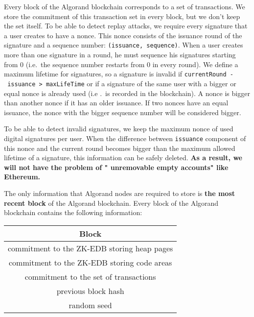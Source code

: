 \documentclass[11pt, A4]{article}
\begin{document}
    Every block of the Algorand blockchain corresponds to a set of transactions. We store the commitment of this
    transaction set in every block, but we don't keep the set itself. To be able to detect replay attacks, we require
    every signature that a user creates to have a nonce. This nonce consists of the issuance round of the signature
    and a sequence number: \texttt{(issuance,\ sequence)}. When a user creates more than one signature in a round, he
    must sequence his signatures starting from 0 (i.e.~the sequence number restarts from 0 in every round). We define
    a maximum lifetime for signatures, so a signature is invalid if \texttt{currentRound\ -\ issuance\
        \textgreater{}\ maxLifeTime} or if a signature of the same user with a bigger or equal nonce is already used
    (i.e
    .~is recorded in the blockchain). A nonce is bigger than another nonce if it has an older issuance. If two nonces
    have an equal issuance, the nonce with the bigger sequence number will be considered bigger.

    To be able to detect invalid signatures, we keep the maximum nonce of used digital signatures per user. When the
    difference between \texttt{issuance} component of this nonce and the current round becomes bigger than the
    maximum allowed lifetime of a signature, this information can be safely deleted. \textbf{As a result, we will not
    have the problem of " unremovable empty accounts" like Ethereum.}

    The only information that Algorand nodes are required to store is \textbf{the most recent block} of the Algorand
    blockchain. Every block of the Algorand blockchain contains the following information:

    \begin{center}
        \begin{tabular}{||c||}
            \hline
            Block \\ [0.5ex]
            \hline\hline
            commitment to the ZK-EDB storing heap pages \\ [0.7ex]
            commitment to the ZK-EDB storing code areas \\ [0.7ex]
            commitment to the set of transactions       \\ [0.7ex]
            previous block hash                         \\ [0.7ex]
            random seed                                 \\ [0.7ex]
            \hline
        \end{tabular}
    \end{center}
\end{document}
